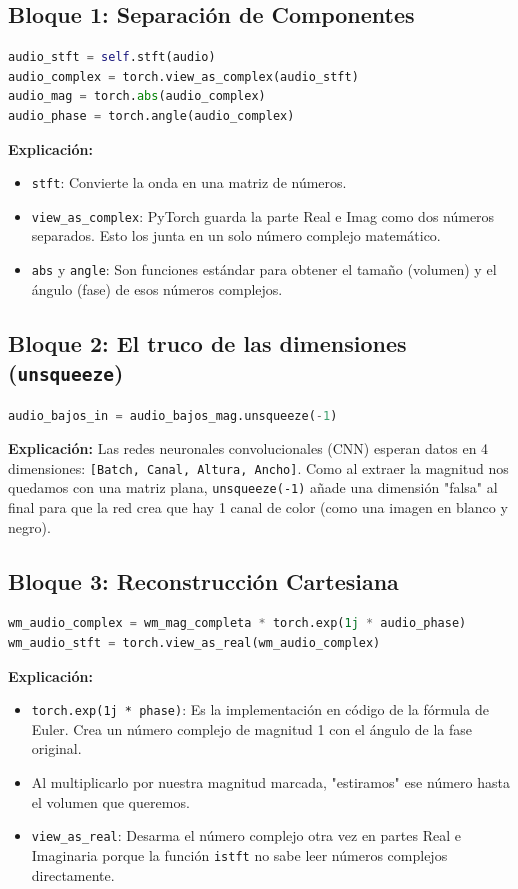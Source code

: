 \documentclass[11pt,a4paper]{article}
\begin{document}
\subsection{Bloque 1: Separación de Componentes}
\begin{lstlisting}[language=Python]
audio_stft = self.stft(audio) 
audio_complex = torch.view_as_complex(audio_stft)
audio_mag = torch.abs(audio_complex)
audio_phase = torch.angle(audio_complex)
\end{lstlisting}
\textbf{Explicación:} 
\begin{itemize}
    \item \texttt{stft}: Convierte la onda en una matriz de números.
    \item \texttt{view\_as\_complex}: PyTorch guarda la parte Real e Imag como dos números separados. Esto los junta en un solo número complejo matemático.
    \item \texttt{abs} y \texttt{angle}: Son funciones estándar para obtener el tamaño (volumen) y el ángulo (fase) de esos números complejos.
\end{itemize}

\subsection{Bloque 2: El truco de las dimensiones (\texttt{unsqueeze})}
\begin{lstlisting}[language=Python]
audio_bajos_in = audio_bajos_mag.unsqueeze(-1)
\end{lstlisting}
\textbf{Explicación:} 
Las redes neuronales convolucionales (CNN) esperan datos en 4 dimensiones: \texttt{[Batch, Canal, Altura, Ancho]}. Como al extraer la magnitud nos quedamos con una matriz plana, \texttt{unsqueeze(-1)} añade una dimensión "falsa" al final para que la red crea que hay 1 canal de color (como una imagen en blanco y negro).

\subsection{Bloque 3: Reconstrucción Cartesiana}
\begin{lstlisting}[language=Python]
wm_audio_complex = wm_mag_completa * torch.exp(1j * audio_phase)
wm_audio_stft = torch.view_as_real(wm_audio_complex)
\end{lstlisting}
\textbf{Explicación:} 
\begin{itemize}
    \item \texttt{torch.exp(1j * phase)}: Es la implementación en código de la fórmula de Euler. Crea un número complejo de magnitud 1 con el ángulo de la fase original.
    \item Al multiplicarlo por nuestra magnitud marcada, "estiramos" ese número hasta el volumen que queremos.
    \item \texttt{view\_as\_real}: Desarma el número complejo otra vez en partes Real e Imaginaria porque la función \texttt{istft} no sabe leer números complejos directamente.
\end{itemize}
\end{document}
